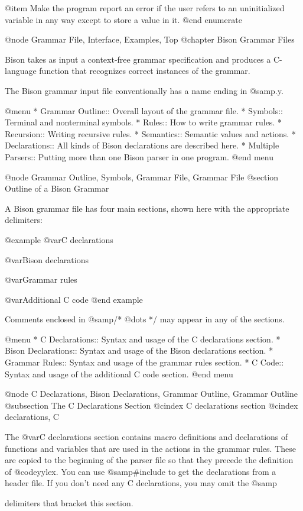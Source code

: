 {{{{{{{{{{{{{{@item
Make the program report an error if the user refers to an
uninitialized variable in any way except to store a value in it.
@end enumerate

@node Grammar File, Interface, Examples, Top
@chapter Bison Grammar Files

Bison takes as input a context-free grammar specification and produces a
C-language function that recognizes correct instances of the grammar.

The Bison grammar input file conventionally has a name ending in @samp{.y}.

@menu
* Grammar Outline::    Overall layout of the grammar file.
* Symbols::            Terminal and nonterminal symbols.
* Rules::              How to write grammar rules.
* Recursion::	       Writing recursive rules.
* Semantics::          Semantic values and actions.
* Declarations::       All kinds of Bison declarations are described here.
* Multiple Parsers::   Putting more than one Bison parser in one program.
@end menu

@node Grammar Outline, Symbols, Grammar File, Grammar File
@section Outline of a Bison Grammar

A Bison grammar file has four main sections, shown here with the
appropriate delimiters:

@example
@var{C declarations}

@var{Bison declarations}

@var{Grammar rules}

@var{Additional C code}
@end example

Comments enclosed in @samp{/* @dots{} */} may appear in any of the sections.

@menu
* C Declarations::      Syntax and usage of the C declarations section.
* Bison Declarations::  Syntax and usage of the Bison declarations section.
* Grammar Rules::       Syntax and usage of the grammar rules section.
* C Code::              Syntax and usage of the additional C code section.
@end menu

@node C Declarations, Bison Declarations, Grammar Outline, Grammar Outline
@subsection The C Declarations Section
@cindex C declarations section
@cindex declarations, C

The @var{C declarations} section contains macro definitions and
declarations of functions and variables that are used in the actions in the
grammar rules.  These are copied to the beginning of the parser file so
that they precede the definition of @code{yylex}.  You can use
@samp{#include} to get the declarations from a header file.  If you don't
need any C declarations, you may omit the @samp{%
delimiters that bracket this section.

}}}}}}}}}}}}}}}
